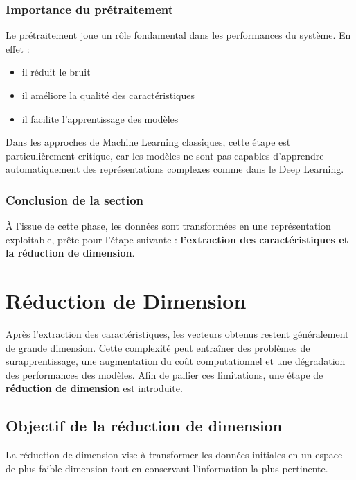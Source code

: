 \documentclass[12pt,a4paper]{article}
\begin{document}
    \subsubsection{Importance du prétraitement}

    Le prétraitement joue un rôle fondamental dans les performances du système.
    En effet :
    \begin{itemize}
        \item il réduit le bruit
        \item il améliore la qualité des caractéristiques
        \item il facilite l’apprentissage des modèles
    \end{itemize}

    Dans les approches de Machine Learning classiques, cette étape est particulièrement critique, car les modèles ne sont pas capables d’apprendre automatiquement des représentations complexes comme dans le Deep Learning.

    \subsubsection{Conclusion de la section}

    À l’issue de cette phase, les données sont transformées en une représentation exploitable, prête pour l’étape suivante : \textbf{l’extraction des caractéristiques et la réduction de dimension}.

    \section{Réduction de Dimension}

    Après l’extraction des caractéristiques, les vecteurs obtenus restent généralement de grande dimension.
    Cette complexité peut entraîner des problèmes de surapprentissage, une augmentation du coût computationnel et une dégradation des performances des modèles.
    Afin de pallier ces limitations, une étape de \textbf{réduction de dimension} est introduite.

    \subsection{Objectif de la réduction de dimension}

        La réduction de dimension vise à transformer les données initiales en un espace de plus faible dimension tout en conservant l’information la plus pertinente.
\end{document}
